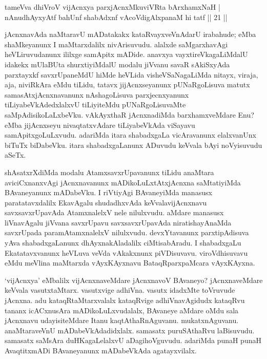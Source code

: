 
\begin{shl}
tameVva dhiVroV vijAcnxya parxjAcnxMkuviVRta bArxhamxNaH |\\
nAnudhAyxyAtf bahUnf shabAdxnf vAcoVdigAlxpanaM hi tatf || 21 ||
\end{shl}

\begin{artha}
jAcnxnavAda naMtaravU mADatakakx kataRvayxveVnAdarU irabahude; eMba shaMkeyanunx  I maMtarxdalilx nivArisuvudu. alalxde saMgarxhavAgi heVLiruvudanunx ililxge samApitx mADide. anavxya vayxtireVkagaLiMdalU idakekx mUlaBUta shurxtiyiMdalU modalu jiVvanu savaR sAkiSxyAda parxtayxkf savxrUpaneMdU hiMde heVLida visheVSaNagaLiMda nitayx, viraja, aja, niviRkAra eMdu tiLidu, tatavx jijAcnxseyanunx pUNaRgoLisuva matutx samasAtxjAcnxnavanunx nAshagoLisuva parxjecnxyanunx tiLiyabeVkAdedxlalxvU tiLiyiteMdu pUNaRgoLisuvaMte saMpAdisikoLaLxbeVku. vAkAyxthaR jAcnxnadiMda barxhamxveMdare Enu? eMba jijAcnxseyu nivaqtatxvAdare tiLiyabeVkAda viSayavu samApitxgoLuLxvudu. adariMda itara shabadxgaLa vicAravanunx elalxvanUnx biTuTx biDabeVku. itara shabadxgaLanunx ADuvudu keVvala bAyi noVyisuvudu aSeTx. 
\end{artha}


\begin{artha}
shAsatxrXdiMda modalu AtamxsavxrUpavanunx tiLidu anaMtara aviciCxnanxvAgi jAcnxnavanunx mADikoLuLxtAtxjAcnxna saMtatiyiMda BAvaneyanunx mADabeVku. I riVtiyAgi BAvaneyiMda manasusx paratatavxdalilx EkavAgalu shudadhxvAda keVvalavijAcnxnavu savxsavxrUpavAda AtamxnalelxV nele nilulxvudu. aMdare manasusx liVnavAgalu jiVvana savxrUpavu savxsavxrUpavAda niratishayAnaMda savxrUpada paramAtamxnalelxV nilulxvudu. devxYtavanunx parxtipAdisuva yAva shabadxgaLanunx dhAyxnakAladalilx ciMtisabAradu. I shabadxgaLu Ekatatavxvanunx heVLuva veVda vAkakxnunx piVDisuvavu. viroVdhisuvavu eMdu meVlina maMtarxda vAyxKAyxnavu BataqRparxpaMcara vAyxKAyxna.
\end{artha}


\begin{artha}
`vijAcnxya' eMbalilx vijAcnxnaveMdare jAcnxnavoV BAvaneyo? jAcnxnaveMdare keVvala vasutxtaMtarx. vasutxvige adhiVna. vasutx idadxMte toVruvude jAcnxna. adu kataqRtaMtarxvalalx kataqRvige adhiVnavAgidudx kataqRvu tananx icACxnusAra mADikoLuLxvudalalx, BAvaneye aMdare oMdu sala jAcnxnavu udayisiteMdare Itanu kaqtAthaRnAguvanu. mukatxnAguvanu. anaMtaraveVnU mADabeVkAdadidxlalx. samasatx puruSAthaRvu laBisuvudu. samasatx saMsAra duHKagaLelalxvU aDagihoVguvudu. adariMda punaH punaH AvaqtitxmADi BAvaneyanunx mADabeVkAda agatayxvilalx.
\end{artha}

